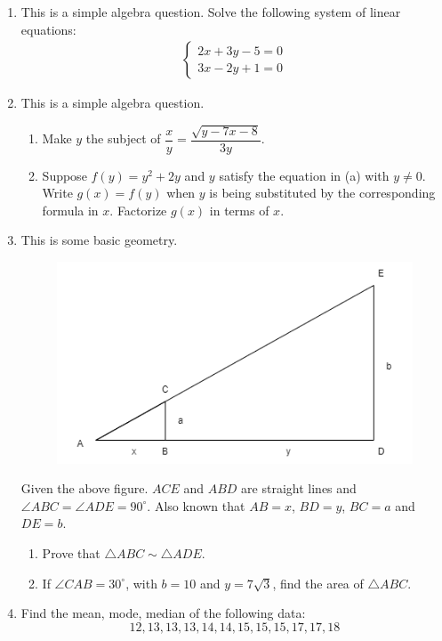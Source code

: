 \documentclass[11pt]{article}
\begin{document}
    \begin{enumerate}
        \item This is a simple algebra question. Solve the following system of linear equations:\begin{align*}
                \begin{cases}
                    2x+3y-5=0\\3x-2y+1=0
                \end{cases}
            \end{align*}
        \item This is a simple algebra question.\begin{enumerate}
            \item Make $y$ the subject of $\dfrac{x}{y}=\dfrac{\sqrt{y-7x-8}}{3y}$.
            \item Suppose $f(y)=y^2+2y$ and $y$ satisfy the equation in (a) with $y\neq 0$. Write $g(x)=f(y)$ when $y$ is being substituted by the corresponding formula in $x$. Factorize $g(x)$ in terms of $x$.
        \end{enumerate}
        \item This is some basic geometry.\begin{figure}[H]
            \centering
            \includegraphics[scale=0.6]{similar_triangle.png}
        \end{figure}Given the above figure. $ACE$ and $ABD$ are straight lines and $\angle ABC=\angle ADE=90^\circ$. Also known that $AB=x$, $BD=y$, $BC=a$ and $DE=b$.\begin{enumerate}
            \item Prove that $\triangle ABC\sim\triangle ADE$.
            \item If $\angle CAB = 30^\circ$, with $b=10$ and $y=7\sqrt{3}$, find the area of $\triangle ABC$.
        \end{enumerate}
        \item Find the mean, mode, median of the following data: $$12,13,13,13,14,14,15,15,15,17,17,18$$


\end{enumerate}
\end{document}

